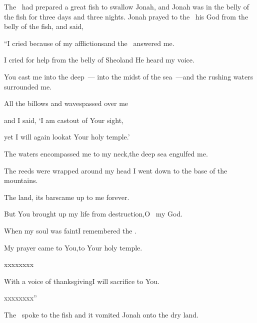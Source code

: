 
\begin{inparaenum}
  The \lord\ had prepared%
  a great fish%
  to swallow Jonah, and Jonah was in the belly of the fish for three days and three nights.%
   Jonah prayed to the \lord\ his God from the belly of the fish,%
   and said,\smallskip%
  
  \pd ``I cried because of my afflictions\pa and the \lord\ answered me.%
  
  \pd I cried for help from the belly of Sheol\pa and He heard my voice.%
  
  \pc {} You cast me into the deep~--- into the midst of the sea~---\pa and the rushing%
  waters surrounded me.%
  
  \pd All the billows and waves\pa passed over me%
  
  \pc {} and I said, `I am cast\pa out of Your sight,%
  
  \pd yet I will again look\pa at Your holy temple.'%
  
  \pc {} The waters encompassed me to my neck,\pa the deep sea engulfed me.%
  
  \pd The reeds%
  were wrapped around my head\pa {} I went down to the base of the mountains.%
  
  \pd The land, its bars\pa came up to me forever.%
  
  \pd But You brought up my life from destruction,\pa O \lord\ my God.%
  
  \pc {} When my soul was faint\pa I remembered the \lord.%
  
  \pd My prayer came to You,\pa to Your holy temple.%
  
  \pc {} xxxx\pa xxxx%
  
  \pc {} With a voice of thanksgiving\pa I will sacrifice to You.%
  
  \pd xxxx\pa xxxx''\smallskip%
  
   The \lord\ spoke to the fish and it vomited Jonah onto the dry land.%
\end{inparaenum}
